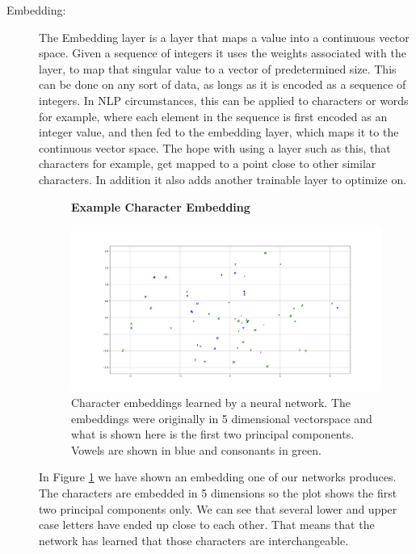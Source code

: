 \begin{description}
    \item[Embedding:]

        The Embedding layer is a layer that maps a value into a continuous
        vector space. Given a sequence of integers it uses the weights
        associated with the layer, to map that singular value to a vector of
        predetermined size. This can be done on any sort of data, as longs as it
        is encoded as a sequence of integers. In \gls{NLP} circumstances, this
        can be applied to characters or words for example, where each element in
        the sequence is first encoded as an integer value, and then fed to the
        embedding layer, which maps it to the continuous vector space. The hope
        with using a layer such as this, that characters for example, get mapped
        to a point close to other similar characters. In addition it also adds
        another trainable layer to optimize on.

        \begin{figure}
            \centering
            \textbf{Example Character Embedding}\par\medskip
            \includegraphics[width=\textwidth]{./pictures/method/example_character_embeddings.png}
            \caption{Character embeddings learned by a neural network. The
                embeddings were originally in 5 dimensional vectorspace and what
                is shown here is the first two principal components. Vowels are
                shown in blue and consonants in green.}
            \label{fig:embeddings}
        \end{figure}

        In Figure \ref{fig:embeddings} we have shown an embedding one of our
        networks produces. The characters are embedded in 5 dimensions so the
        plot shows the first two principal components only. We can see that
        several lower and upper case letters have ended up close to each other.
        That means that the network has learned that those characters are
        interchangeable.


\end{description}

